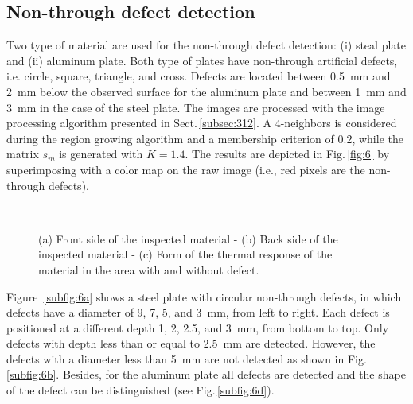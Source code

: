 \subsection{Non-through defect detection}


Two type of material are used for the non-through defect detection: (i) steal plate and (ii) aluminum plate.
Both type of plates have non-through artificial defects, i.e. circle, square, triangle, and cross.
Defects are located between \SI{0.5}{\milli \metre} and \SI{2}{\milli \metre} below the observed surface for the aluminum plate and between \SI{1}{\milli \metre} and \SI{3}{\milli \metre} in the case of the steel plate.
The images are processed with the image processing algorithm presented in Sect.\,\ref{subsec:312}.
A 4-neighbors is considered during the region growing algorithm and a membership criterion of $0.2$, while the matrix $s_m$ is generated with $K=1.4$.
The results are depicted in Fig.\,\ref{fig:6} by superimposing with a color map on the raw image (i.e., red pixels are the non-through defects).

\begin{figure}
  \centering
  \hspace*{\fill}
   \hfill
  \hspace*{\fill} \\ \hspace*{\fill}
  \hspace*{\fill}
  \caption{(a) Front side of the inspected material - (b) Back side of the inspected material 
	- (c) Form of the thermal response of the material in the area with and without defect.}
  \label{fig:44}
\end{figure}

Figure~\ref{subfig:6a} shows a steel plate with circular non-through defects, in which defects have a diameter of 9, 7, 5, and \SI{3}{\milli \metre}, from left to right. 
Each defect is positioned at a different depth 1, 2, 2.5, and \SI{3}{\milli \metre}, from bottom to top. 
Only defects with depth less than or equal to \SI{2.5}{\milli \metre} are detected. 
However, the defects with a diameter less than \SI{5}{\milli \metre} are not detected as shown in Fig.\,\ref{subfig:6b}.
Besides, for the aluminum plate all defects are detected and the shape of the defect can be distinguished (see Fig.\,\ref{subfig:6d}). 


